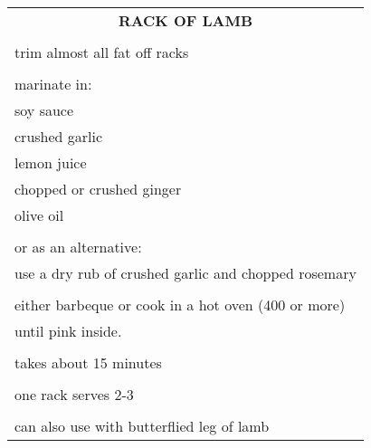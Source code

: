 \documentclass[8pt]{report}
\begin{document}
\begin{tabular}{|l|} \hline	%
 
\multicolumn{1}{|c|}{\textbf{RACK OF LAMB}}
\\
\\

\index{fish/meat!rack of lamb} \index{rack of lamb} \index{lamb!rack
of}


trim almost all fat off racks\\
\\
marinate in:\\
\hspace{0.5 in}	soy sauce\\
\hspace{0.5 in}	crushed garlic\\
\hspace{0.5 in}	lemon juice\\
\hspace{0.5 in}	chopped or crushed ginger\\
\hspace{0.5 in}	olive oil\\
\\
or as an alternative:\\
\hspace{0.5 in}	use a dry rub of crushed garlic and chopped rosemary\\
\\
either barbeque or cook in a hot oven (400 or more)\\
until pink inside.\\
\\
takes about 15 minutes\\
\\
one rack serves 2-3\\
\\
can also use with butterflied leg of lamb\\

\hline

\end{tabular}

\newpage

\centering
\end{document}
